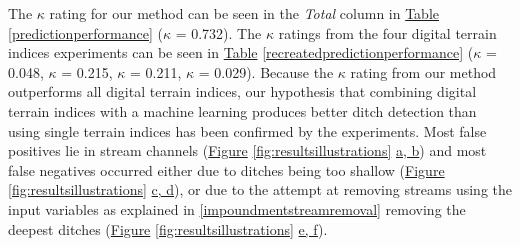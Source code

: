 \documentclass[]{interact}
\theoremstyle{plain}%
\theoremstyle{definition}
\theoremstyle{remark}
\begin{document}
\begin{table}[!htb]
    \label{predictionperformance}
\end{table}

The $\kappa$ rating for our method can be seen in the \textit{Total} column in \hyperref[predictionperformance]{Table} \ref{predictionperformance} ($\kappa$ = 0.732). The $\kappa$ ratings from the four digital terrain indices experiments can be seen in  \hyperref[recreatedpredictionperformance]{Table} \ref{recreatedpredictionperformance} ($\kappa$ = 0.048, $\kappa$ = 0.215, $\kappa$ = 0.211, $\kappa$ = 0.029). Because the $\kappa$ rating from our method outperforms all digital terrain indices, our hypothesis that combining digital terrain indices with a machine learning produces better ditch detection than using single terrain indices has been confirmed by the experiments. Most false positives lie in stream channels (\hyperref[fig:resultsillustrations]{Figure} \ref{fig:resultsillustrations} \hyperref[fig:resultsillustrations]{a, b}) and most false negatives occurred either due to ditches being too shallow (\hyperref[fig:resultsillustrations]{Figure} \ref{fig:resultsillustrations} \hyperref[fig:resultsillustrations]{c, d}), or due to the attempt at removing streams using the input variables as explained in \ref{impoundmentstreamremoval} removing the deepest ditches  (\hyperref[fig:resultsillustrations]{Figure} \ref{fig:resultsillustrations} \hyperref[fig:resultsillustrations]{e, f}).
\end{document}
